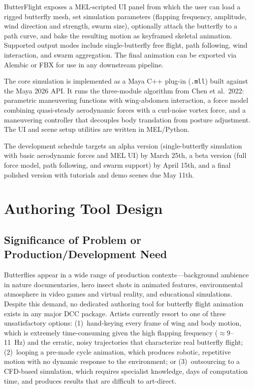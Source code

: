 \documentclass[12pt]{article}
\begin{document}
ButterFlight exposes a MEL-scripted UI panel from which the user can load a rigged
butterfly mesh, set simulation parameters (flapping frequency, amplitude, wind
direction and strength, swarm size), optionally attach the butterfly to a path curve,
and bake the resulting motion as keyframed skeletal animation. Supported output modes
include single-butterfly free flight, path following, wind interaction, and swarm
aggregation. The final animation can be exported via Alembic or FBX for use in any
downstream pipeline.

The core simulation is implemented as a Maya C++ plug-in (\texttt{.mll}) built against
the Maya 2026 API. It runs the three-module algorithm from Chen et al.\ 2022:
parametric maneuvering functions with wing-abdomen interaction, a force model combining
quasi-steady aerodynamic forces with a curl-noise vortex force, and a maneuvering
controller that decouples body translation from posture adjustment. The UI and scene
setup utilities are written in MEL/Python.

The development schedule targets an alpha version (single-butterfly simulation with
basic aerodynamic forces and MEL UI) by March 25th, a beta version (full force model,
path following, and swarm support) by April 15th, and a final polished version
with tutorials and demo scenes due May 11th.

\newpage

\section{Authoring Tool Design}

\subsection{Significance of Problem or Production/Development Need}

Butterflies appear in a wide range of production contexts---background ambience in
nature documentaries, hero insect shots in animated features, environmental
atmosphere in video games and virtual reality, and educational simulations.
Despite this demand, no dedicated authoring tool for butterfly flight animation
exists in any major DCC package. Artists currently resort to one of three
unsatisfactory options: (1)~hand-keying every frame of wing and body motion,
which is extremely time-consuming given the high flapping frequency
($\approx$9--11~Hz) and the erratic, noisy trajectories that characterize real
butterfly flight; (2)~looping a pre-made cycle animation, which produces
robotic, repetitive motion with no dynamic response to the environment; or
(3)~outsourcing to a CFD-based simulation, which requires specialist knowledge,
days of computation time, and produces results that are difficult to art-direct.
\end{document}
